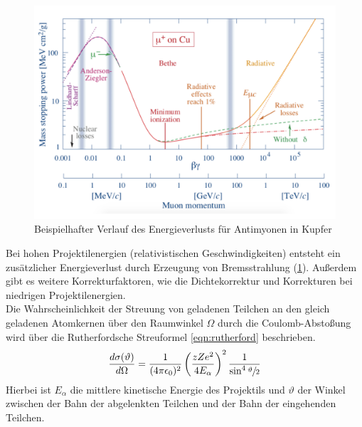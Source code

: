 \begin{figure}[h!]
  \centering
  \includegraphics[width=\textwidth]{images/bethebloch.pdf}
  \caption{Beispielhafter Verlauf des Energieverlusts für Antimyonen in Kupfer \cite{pdg}}
  \label{fig:bethebloch}
\end{figure}
Bei hohen Projektilenergien (relativistischen Geschwindigkeiten) entsteht ein zusätzlicher Energieverlust durch Erzeugung von Bremsstrahlung (\ref{fig:bethebloch}).
Außerdem gibt es weitere Korrekturfaktoren, wie die Dichtekorrektur und Korrekturen bei niedrigen Projektilenergien.
%
\\Die Wahrscheinlichkeit der Streuung von geladenen Teilchen an den gleich geladenen Atomkernen über den Raumwinkel $\Omega$ durch die Coulomb-Abstoßung wird über die Rutherfordsche Streuformel \eqref{eqn:rutherford} beschrieben.
\begin{equation}
	\frac{d \sigma(\vartheta)}{d \Omega} = \frac{1}{(4 \pi \epsilon_0)^2} \left( \frac{z Z e^2}{4 E_{\alpha}} \right)^2 \frac{1}{\sin^4{\sfrac{\vartheta}{2}}}
	\label{eqn:rutherford}
\end{equation}
Hierbei ist $E_{\alpha}$ die mittlere kinetische Energie des Projektils und $\vartheta$ der Winkel zwischen der Bahn der abgelenkten Teilchen und der Bahn der eingehenden Teilchen.
